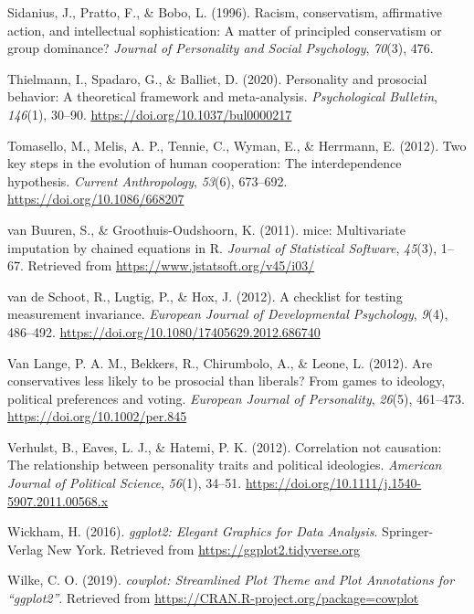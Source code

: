 \documentclass[
  man,floatsintext]{apa6}
\newlength{\cslhangindent}
\newlength{\cslentryspacingunit} %
\newenvironment{CSLReferences}[2] %
 {%
  \setlength{\parindent}{0pt}
  \ifodd #1
  \let\oldpar\par
  \def\par{\hangindent=\cslhangindent\oldpar}
  \fi
  \setlength{\parskip}{#2\cslentryspacingunit}
 }%
 {}
\begin{document}
\begin{CSLReferences}{1}{0}
\leavevmode{}%
Sidanius, J., Pratto, F., \& Bobo, L. (1996). Racism, conservatism, affirmative action, and intellectual sophistication: A matter of principled conservatism or group dominance? \emph{Journal of Personality and Social Psychology}, \emph{70}(3), 476.

\leavevmode{}%
Thielmann, I., Spadaro, G., \& Balliet, D. (2020). Personality and prosocial behavior: A theoretical framework and meta-analysis. \emph{Psychological Bulletin}, \emph{146}(1), 30--90. \url{https://doi.org/10.1037/bul0000217}

\leavevmode{}%
Tomasello, M., Melis, A. P., Tennie, C., Wyman, E., \& Herrmann, E. (2012). Two key steps in the evolution of human cooperation: The interdependence hypothesis. \emph{Current Anthropology}, \emph{53}(6), 673--692. \url{https://doi.org/10.1086/668207}

\leavevmode{}%
van Buuren, S., \& Groothuis-Oudshoorn, K. (2011). {mice}: Multivariate imputation by chained equations in {R}. \emph{Journal of Statistical Software}, \emph{45}(3), 1--67. Retrieved from \url{https://www.jstatsoft.org/v45/i03/}

\leavevmode{}%
van de Schoot, R., Lugtig, P., \& Hox, J. (2012). A checklist for testing measurement invariance. \emph{European Journal of Developmental Psychology}, \emph{9}(4), 486--492. \url{https://doi.org/10.1080/17405629.2012.686740}

\leavevmode{}%
Van Lange, P. A. M., Bekkers, R., Chirumbolo, A., \& Leone, L. (2012). Are conservatives less likely to be prosocial than liberals? From games to ideology, political preferences and voting. \emph{European Journal of Personality}, \emph{26}(5), 461--473. \url{https://doi.org/10.1002/per.845}

\leavevmode{}%
Verhulst, B., Eaves, L. J., \& Hatemi, P. K. (2012). Correlation not causation: The relationship between personality traits and political ideologies. \emph{American Journal of Political Science}, \emph{56}(1), 34--51. \url{https://doi.org/10.1111/j.1540-5907.2011.00568.x}

\leavevmode{}%
Wickham, H. (2016). \emph{{ggplot2: Elegant Graphics for Data Analysis}}. Springer-Verlag New York. Retrieved from \url{https://ggplot2.tidyverse.org}

\leavevmode{}%
Wilke, C. O. (2019). \emph{{cowplot: Streamlined Plot Theme and Plot Annotations for {``ggplot2''}}}. Retrieved from \url{https://CRAN.R-project.org/package=cowplot}

\end{CSLReferences}
\end{document}
